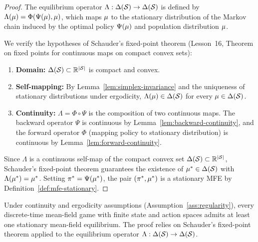 \documentclass[11pt,a4paper]{article}
\begin{document}
\begin{proof}
The equilibrium operator $\Lambda: \Delta(\mathcal{S}) \to
\Delta(\mathcal{S})$ is defined by $\Lambda(\mu) =
\Phi(\Psi(\mu), \mu)$, which maps $\mu$ to
the stationary distribution of the Markov chain induced by the
optimal policy $\Psi(\mu)$ and population distribution
$\mu$.

We verify the hypotheses of Schauder's fixed-point theorem
(Lesson~16, Theorem on fixed points for continuous maps on
compact convex sets):

\begin{enumerate}
  \item \textbf{Domain:} $\Delta(\mathcal{S}) \subset \mathbb{R}^{|\mathcal{S}|}$
    is compact and convex.

  \item \textbf{Self-mapping:} By Lemma~\ref{lem:simplex-invariance}
    and the uniqueness of stationary distributions under ergodicity,
    $\Lambda(\mu) \in \Delta(\mathcal{S})$ for every $\mu
    \in \Delta(\mathcal{S})$.

  \item \textbf{Continuity:} $\Lambda = \Phi \circ \Psi$ is the
    composition of two continuous maps.  The backward operator $\Psi$
    is continuous by Lemma~\ref{lem:backward-continuity}, and the
    forward operator $\Phi$ (mapping policy to stationary
    distribution) is continuous by Lemma~\ref{lem:forward-continuity}.
\end{enumerate}

Since $\Lambda$ is a continuous self-map of the compact convex set
$\Delta(\mathcal{S}) \subset \mathbb{R}^{|\mathcal{S}|}$, Schauder's fixed-point
theorem guarantees the existence of $\mu^* \in
\Delta(\mathcal{S})$ with $\Lambda(\mu^*) = \mu^*$.
Setting $\pi^* = \Psi(\mu^*)$, the pair $(\pi^*,
\mu^*)$ is a stationary MFE by
Definition~\ref{def:mfe-stationary}.
\end{proof}

\begin{keyresult}[title={Existence of Mean-Field Equilibrium}]
Under continuity and ergodicity assumptions
(Assumption~\ref{ass:regularity}), every discrete-time mean-field
game with finite state and action spaces admits at least one
stationary mean-field equilibrium.  The proof relies on Schauder's
fixed-point theorem applied to the equilibrium operator
$\Lambda: \Delta(\mathcal{S}) \to \Delta(\mathcal{S})$.
\end{keyresult}
\end{document}
